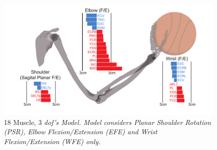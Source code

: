 \documentclass[12pt]{article}
\begin{document}
\begin{figure}[H]
\centering
\includegraphics{images/ArmSkeletonFigure}
\caption{18 Muscle, 3 \it dof\rm's Model. Model considers Planar Shoulder Rotation (PSR), Elbow Flexion/Extension (EFE) and Wrist Flexion/Extension (WFE) only. }\label{Figure1}
\end{figure}
\end{document}
